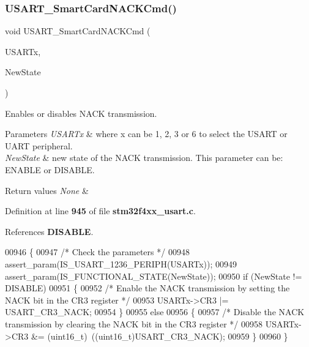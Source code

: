 \subsubsection{U\+S\+A\+R\+T\+\_\+\+Smart\+Card\+N\+A\+C\+K\+Cmd()}
{\footnotesize\ttfamily void U\+S\+A\+R\+T\+\_\+\+Smart\+Card\+N\+A\+C\+K\+Cmd (\begin{DoxyParamCaption}\item[{\textbf{ U\+S\+A\+R\+T\+\_\+\+Type\+Def} $\ast$}]{U\+S\+A\+R\+Tx,  }\item[{\textbf{ Functional\+State}}]{New\+State }\end{DoxyParamCaption})}



Enables or disables N\+A\+CK transmission. 


\begin{DoxyParams}{Parameters}
{\em U\+S\+A\+R\+Tx} & where x can be 1, 2, 3 or 6 to select the U\+S\+A\+RT or U\+A\+RT peripheral. \\
\hline
{\em New\+State} & new state of the N\+A\+CK transmission. This parameter can be\+: E\+N\+A\+B\+LE or D\+I\+S\+A\+B\+LE. \\
\hline
\end{DoxyParams}

\begin{DoxyRetVals}{Return values}
{\em None} & \\
\hline
\end{DoxyRetVals}


Definition at line \textbf{ 945} of file \textbf{ stm32f4xx\+\_\+usart.\+c}.



References \textbf{ D\+I\+S\+A\+B\+LE}.


\begin{DoxyCode}
00946 \{
00947   \textcolor{comment}{/* Check the parameters */}
00948   assert_param(IS_USART_1236_PERIPH(USARTx)); 
00949   assert_param(IS_FUNCTIONAL_STATE(NewState));
00950   \textcolor{keywordflow}{if} (NewState != DISABLE)
00951   \{
00952     \textcolor{comment}{/* Enable the NACK transmission by setting the NACK bit in the CR3 register */}
00953     USARTx->CR3 |= USART_CR3_NACK;
00954   \}
00955   \textcolor{keywordflow}{else}
00956   \{
00957     \textcolor{comment}{/* Disable the NACK transmission by clearing the NACK bit in the CR3 register */}
00958     USARTx->CR3 &= (uint16\_t)~((uint16\_t)USART_CR3_NACK);
00959   \}
00960 \}
\end{DoxyCode}

